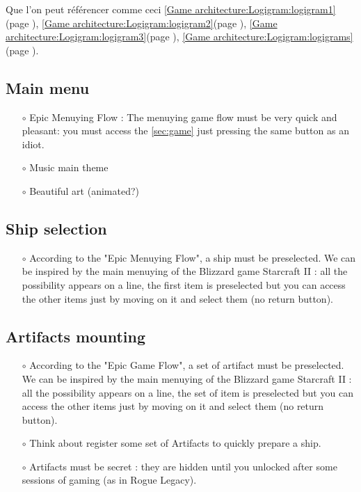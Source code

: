 \documentclass[12pt,a4paper]{article}
\begin{document}
        Que l'on peut référencer comme ceci \ref{Game architecture:Logigram:logigram1}(page \pageref{Game architecture:Logigram:logigram1}), \ref{Game architecture:Logigram:logigram2}(page \pageref{Game architecture:Logigram:logigram2}), \ref{Game architecture:Logigram:logigram3}(page \pageref{Game architecture:Logigram:logigram3}), \ref{Game architecture:Logigram:logigrams}(page \pageref{Game architecture:Logigram:logigrams}).

    \subsection{Main menu}
        \begin{itemize}
            \item[$\circ$] Epic Menuying Flow : The menuying game flow must be very quick and pleasant: you must access the \ref{sec:game} just pressing the same button as an idiot.
            \item[$\circ$] Music main theme
            \item[$\circ$] Beautiful art (animated?)
        \end{itemize}

    \subsection{Ship selection}
        \begin{itemize}
            \item[$\circ$] According to the "Epic Menuying Flow", a ship must be preselected. We can be inspired by the main menuying of the Blizzard game Starcraft II : all the possibility appears on a line, the first item is preselected but you can access the other items just by moving on it and select them (no return button).
        \end{itemize}
        
    \subsection{Artifacts mounting}
        \begin{itemize}
            \item[$\circ$] According to the "Epic Game Flow", a set of artifact must be preselected. We can be inspired by the main menuying of the Blizzard game Starcraft II : all the possibility appears on a line, the set of item is preselected but you can access the other items just by moving on it and select them (no return button).
            \item[$\circ$] Think about register some set of Artifacts to quickly prepare a ship.
            \item[$\circ$] Artifacts must be secret : they are hidden until you unlocked after some sessions of gaming (as in Rogue Legacy).
        \end{itemize}
        
\end{document}
